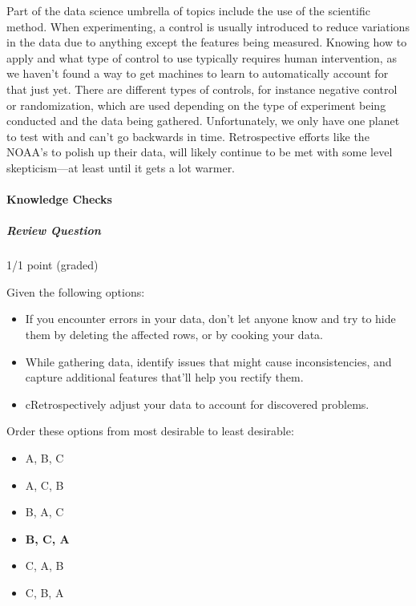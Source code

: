 \documentclass[11pt]{article}
\providecommand{\tightlist}{%
      \setlength{\itemsep}{0pt}\setlength{\parskip}{0pt}}
\begin{document}
Part of the data science umbrella of topics include the use of the
scientific method. When experimenting, a control is usually introduced
to reduce variations in the data due to anything except the features
being measured. Knowing how to apply and what type of control to use
typically requires human intervention, as we haven't found a way to get
machines to learn to automatically account for that just yet. There are
different types of controls, for instance negative control or
randomization, which are used depending on the type of experiment being
conducted and the data being gathered. Unfortunately, we only have one
planet to test with and can't go backwards in time. Retrospective
efforts like the NOAA's to polish up their data, will likely continue to
be met with some level skepticism---at least until it gets a lot warmer.

\hypertarget{knowledge-checks}{%
\paragraph{Knowledge Checks}\label{knowledge-checks}}

\hypertarget{review-question}{%
\subparagraph{Review Question}\label{review-question}}

1/1 point (graded)

Given the following options:

\begin{itemize}
\item
  If you encounter errors in your data, don't let anyone know and try to
  hide them by deleting the affected rows, or by cooking your data.
\item
  While gathering data, identify issues that might cause
  inconsistencies, and capture additional features that'll help you
  rectify them.
\item
  cRetrospectively adjust your data to account for discovered problems.
\end{itemize}

Order these options from most desirable to least desirable:

\begin{itemize}
\tightlist
\item
  A, B, C
\item
  A, C, B
\item
  B, A, C
\item
  \textbf{B, C, A}
\item
  C, A, B
\item
  C, B, A
\end{itemize}
\end{document}
